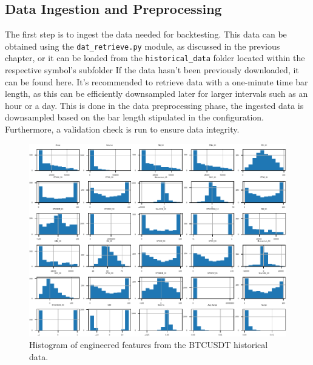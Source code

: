 \subsection{Data Ingestion and Preprocessing}
The first step is to ingest the data needed for backtesting. This data can be obtained using the \texttt{dat\_retrieve.py} module,
as discussed in the previous chapter, or it can be loaded from the \texttt{historical\_data} folder located within the respective symbol's subfolder
If the data hasn't been previously downloaded, it can be found here. It's recommended to retrieve data with a one-minute time bar length,
as this can be efficiently downsampled later for larger intervals such as an hour or a day.
This is done in the data preprocessing phase, the ingested data is downsampled based on the bar length stipulated in the configuration. Furthermore, a validation check is run to ensure data integrity.

\begin{figure}[h]
\centering
\begin{adjustbox}{max width=1.15\textwidth,center}
    \includegraphics[scale=1.15]{./pdf/dataset_histogram.pdf}
\end{adjustbox}
\caption{Histogram of engineered features from the BTCUSDT historical data.}
\label{fig:dataset_histogram}
\end{figure}


\FloatBarrier %
